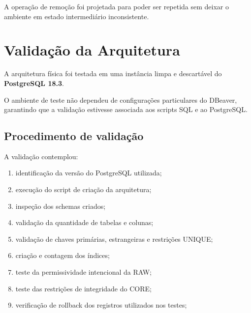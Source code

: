 \documentclass[12pt,a4paper]{article}
\begin{document}
{	A operação de remoção foi projetada para poder ser repetida sem deixar
	o ambiente em estado intermediário inconsistente.
	
	\section{Validação da Arquitetura}
	
	A arquitetura física foi testada em uma instância limpa e descartável
	do \textbf{PostgreSQL 18.3}.
	
	O ambiente de teste não dependeu de configurações particulares do
	DBeaver, garantindo que a validação estivesse associada aos scripts
	SQL e ao PostgreSQL.
	
	\subsection{Procedimento de validação}
	
	A validação contemplou:
	
	\begin{enumerate}[leftmargin=1.2cm]
		
		\item identificação da versão do PostgreSQL utilizada;
		
		\item execução do script de criação da arquitetura;
		
		\item inspeção dos schemas criados;
		
		\item validação da quantidade de tabelas e colunas;
		
		\item validação de chaves primárias, estrangeiras e restrições UNIQUE;
		
		\item criação e contagem dos índices;
		
		\item teste da permissividade intencional da RAW;
		
		\item teste das restrições de integridade do CORE;
		
		\item verificação de rollback dos registros utilizados nos testes;
		

\end{enumerate}}
\end{document}
